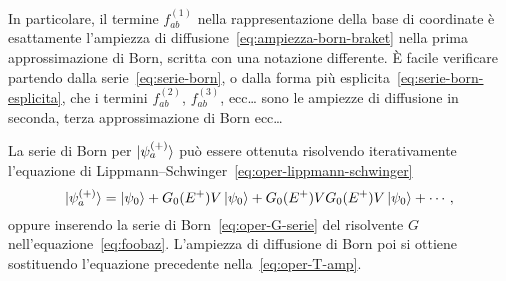 \documentclass[a4paper,fleqn,twoside,12pt]{article}
\begin{document}
In particolare, il termine $f_{ab}^{(1)}$ nella rappresentazione della base di
coordinate è esattamente l'ampiezza di
diffusione~\eqref{eq:ampiezza-born-braket} nella prima approssimazione di Born,
scritta con una notazione differente.  È facile verificare partendo dalla
serie~\eqref{eq:serie-born}, o dalla forma più
esplicita~\eqref{eq:serie-born-esplicita}, che i termini $f_{ab}^{(2)}$,
$f_{ab}^{(3)}$, ecc\dots{}
sono le ampiezze di diffusione in seconda, terza approssimazione di Born
ecc\dots{}

La serie di Born per $\ket{\psi_{a}^{(+)}}$ può essere ottenuta risolvendo
iterativamente l'equazione di
Lippmann–Schwinger~\eqref{eq:oper-lippmann-schwinger}
\begin{equation}
  \ket{\psi_{a}^{(+)}} = \ket{\psi_{0}} + G_{0}(E^{+})V\ket{\psi_{0}} +
  G_{0}(E^{+})VG_{0}(E^{+})V\ket{\psi_{0}} + \cdots,
\end{equation}
oppure inserendo la serie di Born~\eqref{eq:oper-G-serie} del risolvente $G$
nell'equazione~\eqref{eq:foobaz}.  L'ampiezza di diffusione di Born poi si
ottiene sostituendo l'equazione precedente nella~\eqref{eq:oper-T-amp}.

{}
\printbibliography
\end{document}
